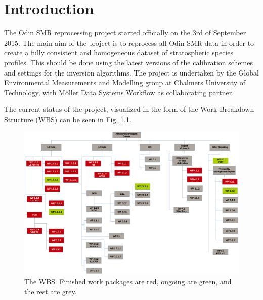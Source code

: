 \chapter{Introduction}
\label{chapter:introduction}

\setcounter{page}{1}


The Odin SMR reprocessing project started officially on the 3rd of September 2015. The main aim of the project is to reprocess all Odin SMR data in order to create a fully consistent and homogeneous dataset of stratospheric species profiles. This should be done using the latest versions of the calibration schemes and settings for the inversion algorithms. The project is undertaken by the Global Environmental Measurements and Modelling group at Chalmers University of Technology, with M\"oller Data Systems Workflow as collaborating partner.   

The current status of the project, visualized in the form of the Work Breakdown Structure (WBS) can be seen in Fig. \ref{fig:WBS}.

\begin{figure}[t]
\centering
\includegraphics[scale = 0.5]{figures/wbsTMMR2.eps}
\caption{The WBS. Finished work packages are red, ongoing are green, and the rest are grey.}
\label{fig:WBS}
\end{figure}

